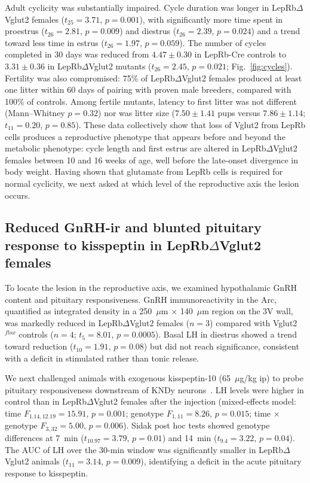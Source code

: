 \documentclass[11pt]{article}
\begin{document}
Adult cyclicity was substantially impaired. Cycle duration was longer in LepRb$\Delta$Vglut2 females ($t_{25}=3.71$, $p=0.001$), with significantly more time spent in proestrus ($t_{26}=2.81$, $p=0.009$) and diestrus ($t_{26}=2.39$, $p=0.024$) and a trend toward less time in estrus ($t_{26}=1.97$, $p=0.059$). The number of cycles completed in 30 days was reduced from $4.47\pm0.30$ in LepRb-Cre controls to $3.31\pm0.36$ in LepRb$\Delta$Vglut2 mutants ($t_{26}=2.45$, $p=0.021$; Fig.~\ref{fig:cycles}). Fertility was also compromised: 75\% of LepRb$\Delta$Vglut2 females produced at least one litter within 60 days of pairing with proven male breeders, compared with 100\% of controls. Among fertile mutants, latency to first litter was not different (Mann--Whitney $p=0.32$) nor was litter size ($7.50\pm1.41$ pups versus $7.86\pm1.14$; $t_{11}=0.20$, $p=0.85$). These data collectively show that loss of Vglut2 from LepRb cells produces a reproductive phenotype that appears before and beyond the metabolic phenotype: cycle length and first estrus are altered in LepRb$\Delta$Vglut2 females between 10 and 16 weeks of age, well before the late-onset divergence in body weight. Having shown that glutamate from LepRb cells is required for normal cyclicity, we next asked at which level of the reproductive axis the lesion occurs.

\subsection{Reduced GnRH-ir and blunted pituitary response to kisspeptin in LepRb$\Delta$Vglut2 females}
To locate the lesion in the reproductive axis, we examined hypothalamic GnRH content and pituitary responsiveness. GnRH immunoreactivity in the Arc, quantified as integrated density in a 250~$\mu$m $\times$ 140~$\mu$m region on the 3V wall, was markedly reduced in LepRb$\Delta$Vglut2 females ($n=3$) compared with Vglut2$^{flox}$ controls ($n=4$; $t_{5}=8.01$, $p=0.0005$). Basal LH in diestrus showed a trend toward reduction ($t_{10}=1.91$, $p=0.08$) but did not reach significance, consistent with a deficit in stimulated rather than tonic release.

We next challenged animals with exogenous kisspeptin-10 (65~$\mu$g/kg ip) to probe pituitary responsiveness downstream of KNDy neurons~\citep{gottsch2004role}. LH levels were higher in control than in LepRb$\Delta$Vglut2 females after the injection (mixed-effects model: time $F_{1.14,12.19}=15.91$, $p=0.001$; genotype $F_{1,11}=8.26$, $p=0.015$; time $\times$ genotype $F_{3,32}=5.00$, $p=0.006$). Sidak post hoc tests showed genotype differences at 7~min ($t_{10.97}=3.79$, $p=0.01$) and 14~min ($t_{9.4}=3.22$, $p=0.04$). The AUC of LH over the 30-min window was significantly smaller in LepRb$\Delta$Vglut2 animals ($t_{11}=3.14$, $p=0.009$), identifying a deficit in the acute pituitary response to kisspeptin.
\end{document}

